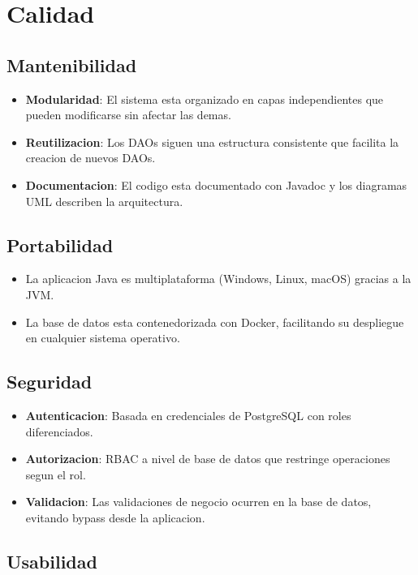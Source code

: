 \documentclass[12pt,a4paper]{article}
\begin{document}
\section{Calidad}

\subsection{Mantenibilidad}

\begin{itemize}
    \item \textbf{Modularidad}: El sistema esta organizado en capas independientes que pueden modificarse sin afectar las demas.
    \item \textbf{Reutilizacion}: Los DAOs siguen una estructura consistente que facilita la creacion de nuevos DAOs.
    \item \textbf{Documentacion}: El codigo esta documentado con Javadoc y los diagramas UML describen la arquitectura.
\end{itemize}

\subsection{Portabilidad}

\begin{itemize}
    \item La aplicacion Java es multiplataforma (Windows, Linux, macOS) gracias a la JVM.
    \item La base de datos esta contenedorizada con Docker, facilitando su despliegue en cualquier sistema operativo.
\end{itemize}

\subsection{Seguridad}

\begin{itemize}
    \item \textbf{Autenticacion}: Basada en credenciales de PostgreSQL con roles diferenciados.
    \item \textbf{Autorizacion}: RBAC a nivel de base de datos que restringe operaciones segun el rol.
    \item \textbf{Validacion}: Las validaciones de negocio ocurren en la base de datos, evitando bypass desde la aplicacion.
\end{itemize}

\subsection{Usabilidad}
\end{document}
